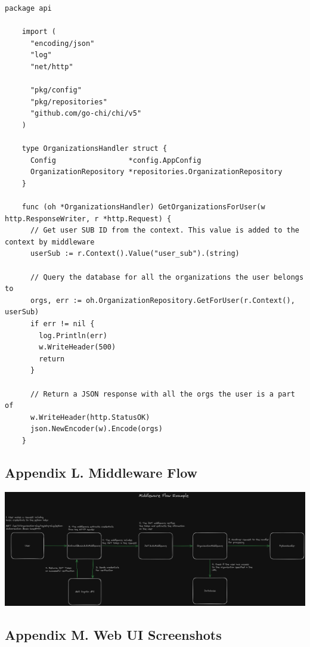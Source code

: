 \documentclass{article}
\begin{document}
  \begin{lstlisting}[language=Golang]
    package api

    import (
      "encoding/json"
      "log"
      "net/http"

      "pkg/config"
      "pkg/repositories"
      "github.com/go-chi/chi/v5"
    )

    type OrganizationsHandler struct {
      Config                 *config.AppConfig
      OrganizationRepository *repositories.OrganizationRepository
    }

    func (oh *OrganizationsHandler) GetOrganizationsForUser(w http.ResponseWriter, r *http.Request) {
      // Get user SUB ID from the context. This value is added to the context by middleware
      userSub := r.Context().Value("user_sub").(string)

      // Query the database for all the organizations the user belongs to
      orgs, err := oh.OrganizationRepository.GetForUser(r.Context(), userSub)
      if err != nil {
        log.Println(err)
        w.WriteHeader(500)
        return
      }

      // Return a JSON response with all the orgs the user is a part of
      w.WriteHeader(http.StatusOK)
      json.NewEncoder(w).Encode(orgs)
    }

  \end{lstlisting}

  \subsection{Appendix L. Middleware Flow}
  \label{sec:appendix-l}

  {\parindent0pt
    \includegraphics[scale=0.18]{appendix/middleware-flow-python-example.png}
  }

  \subsection{Appendix M. Web UI Screenshots}
  \label{sec:appendix-m}
\end{document}
